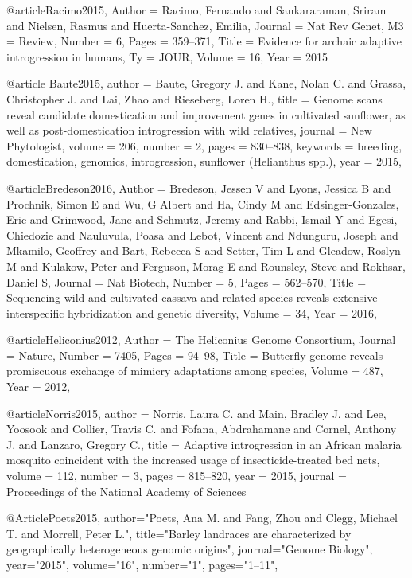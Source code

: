 @article{Racimo2015,
	Author = {Racimo, Fernando and Sankararaman, Sriram and Nielsen, Rasmus and Huerta-Sanchez, Emilia},
	Journal = {Nat Rev Genet},
	M3 = {Review},
	Number = {6},
	Pages = {359--371},
	Title = {Evidence for archaic adaptive introgression in humans},
	Ty = {JOUR},
	Volume = {16},
	Year = {2015}
	}
	
@article {Baute2015,
author = {Baute, Gregory J. and Kane, Nolan C. and Grassa, Christopher J. and Lai, Zhao and Rieseberg, Loren H.},
title = {Genome scans reveal candidate domestication and improvement genes in cultivated sunflower, as well as post-domestication introgression with wild relatives},
journal = {New Phytologist},
volume = {206},
number = {2},
pages = {830--838},
keywords = {breeding, domestication, genomics, introgression, sunflower (Helianthus spp.)},
year = {2015},
}

@article{Bredeson2016,
	Author = {Bredeson, Jessen V and Lyons, Jessica B and Prochnik, Simon E and Wu, G Albert and Ha, Cindy M and Edsinger-Gonzales, Eric and Grimwood, Jane and Schmutz, Jeremy and Rabbi, Ismail Y and Egesi, Chiedozie and Nauluvula, Poasa and Lebot, Vincent and Ndunguru, Joseph and Mkamilo, Geoffrey and Bart, Rebecca S and Setter, Tim L and Gleadow, Roslyn M and Kulakow, Peter and Ferguson, Morag E and Rounsley, Steve and Rokhsar, Daniel S},
	Journal = {Nat Biotech},
	Number = {5},
	Pages = {562--570},
	Title = {Sequencing wild and cultivated cassava and related species reveals extensive interspecific hybridization and genetic diversity},
	Volume = {34},
	Year = {2016},
	}

@article{Heliconius2012,
	Author = {The Heliconius Genome Consortium},
	Journal = {Nature},
	Number = {7405},
	Pages = {94--98},
	Title = {Butterfly genome reveals promiscuous exchange of mimicry adaptations among species},
	Volume = {487},
	Year = {2012},
	}

@article{Norris2015,
author = {Norris, Laura C. and Main, Bradley J. and Lee, Yoosook and Collier, Travis C. and Fofana, Abdrahamane and Cornel, Anthony J. and Lanzaro, Gregory C.}, 
title = {Adaptive introgression in an African malaria mosquito coincident with the increased usage of insecticide-treated bed nets},
volume = {112}, 
number = {3}, 
pages = {815--820}, 
year = {2015}, 
journal = {Proceedings of the National Academy of Sciences} 
}

@Article{Poets2015,
author="Poets, Ana M.
and Fang, Zhou
and Clegg, Michael T.
and Morrell, Peter L.",
title="Barley landraces are characterized by geographically heterogeneous genomic origins",
journal="Genome Biology",
year="2015",
volume="16",
number="1",
pages="1--11",
}

